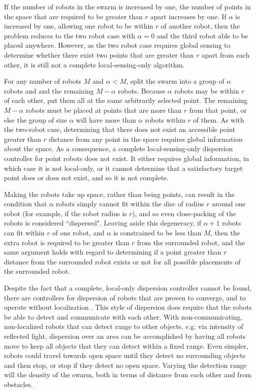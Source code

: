 If the number of robots in the swarm is increased by one, the number of points in the space that are required to be greater than $r$ apart increases by one. 
If $\alpha$ is increased by one, allowing one robot to be within $r$ of another robot, then the problem reduces to the two robot case with $\alpha=0$ and the third robot able to be placed anywhere. 
However, as the two robot case requires global sensing to determine whether there exist two points that are greater than $r$ apart from each other, it is still not a complete local-sensing-only algorithm. 

For any number of robots $M$ and $\alpha < M$, split the swarm into a group of $\alpha$ robots and and the remaining $M - \alpha$ robots. 
Because $\alpha$ robots may be within $r$ of each other, put them all at the same arbitrarily selected point. 
The remaining $M - \alpha$ robots must be placed at points that are more than $r$ from that point, or else the group of size $\alpha$ will have more than $\alpha$ robots within $r$ of them.
As with the two-robot case, determining that there does not exist an accessible point greater than $r$ distance from any point in the space requires global information about the space. 
As a consequence, a complete local-sensing-only dispersion controller for point robots does not exist.
It either requires global information, in which case it is not local-only, or it cannot determine that a satisfactory target point does or does not exist, and so it is not complete.

Making the robots take up space, rather than being points, can result in the condition that $\alpha$ robots simply cannot fit within the disc of radius $r$ around one robot (for example, if the robot radius is $r$), and so even close-packing of the robots is considered ``dispersed".
Leaving aside this degeneracy, if $\alpha + 1$ robots can fit within $r$ of one robot, and $\alpha$ is constrained to be less than $M$, then the extra robot is required to be greater than $r$ from the surrounded robot, and the same argument holds with regard to determining if a point greater than $r$ distance from the surrounded robot exists or not for all possible placements of the surrounded robot.

Despite the fact that a complete, local-only dispersion controller cannot be found, there are controllers for dispersion of robots that are proven to converge, and to operate without localization \citep{correll2009ad}. 
This style of dispersion does require that the robots be able to detect and communicate with each other.
With non-communicating, non-localized robots that can detect range to other objects, e.g. via intensity of reflected light, dispersion over an area can be accomplished by having all robots move to keep all objects that they can detect within a fixed range.
Even simpler, robots could travel towards open space until they detect no surrounding objects and then stop, or stop if they detect no open space.  
Varying the detection range will the density of the swarm, both in terms of distance from each other and from obstacles. 

